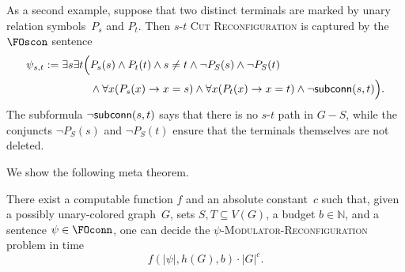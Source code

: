 \documentclass[1p,number,11pt]{elsarticle}
\newcommand{\scon}{\hbox{\sf subconn}}
\newcommand{\N}{\mathbb{N}}
\theoremstyle{plain}
\begin{document}
As a second example, suppose that two distinct terminals are marked by unary
relation symbols~$P_s$ and $P_t$. Then \textsc{$s$-$t$ Cut Reconfiguration}
is captured by the $\FOscon$ sentence
\[
\begin{aligned}
    \psi_{s,t}
    :=
    \exists s\exists t\Bigl(
        &P_s(s)\wedge P_t(t)\wedge s\neq t
        \wedge \neg P_S(s)\wedge \neg P_S(t) \\
        &\wedge \forall x(P_s(x)\rightarrow x=s)
        \wedge \forall x(P_t(x)\rightarrow x=t)
        \wedge \neg \scon(s,t)
    \Bigr).
\end{aligned}
\]
The subformula $\neg\scon(s,t)$ says that there is no $s$-$t$ path in
$G-S$, while the conjuncts $\neg P_S(s)$ and $\neg P_S(t)$ ensure that the
terminals themselves are not deleted.
\medskip

We show the following meta theorem. 

\begin{theorem}[store=thm:modulatorreconfiguration,restate-keys={note=see \zcpageref[nocap]{thm:modulatorreconfiguration}}]
There exist a computable function $f$ and an absolute constant~$c$ such that,
given a possibly unary-colored graph~$G$, sets $S,T\subseteq V(G)$, a budget
$b\in\N$, and a sentence $\psi\in\FOconn$, one can decide the
\textsc{$\psi$-Modulator-Reconfiguration} problem in time
\[
f(|\psi|,h(G),b)\cdot |G|^c.
\]
\end{theorem}
\end{document}
